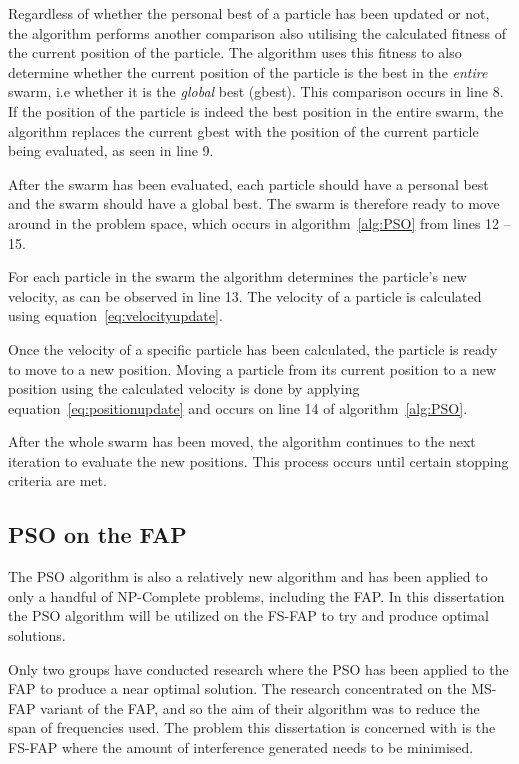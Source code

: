 Regardless of whether the personal best of a particle has been updated or not, the algorithm performs another comparison also utilising the calculated fitness of the current position of the particle. The algorithm uses this fitness to also determine whether the current position of the particle is the best in the \emph{entire} swarm, i.e whether it is  the \emph{global} best (gbest). This comparison occurs in line  8.
If the position of the particle is indeed the best position in the entire swarm, the algorithm replaces the current gbest with the position of the current particle being evaluated, as seen in line 9.

After the swarm has been evaluated, each particle should have a personal best and the swarm should have a global best. The swarm is therefore ready to move around in the problem space, which occurs in algorithm~\ref{alg:PSO} from lines 12 -- 15.

For each particle in the swarm the algorithm determines the particle's new velocity, as can be observed in line 13. The velocity of a particle is calculated using equation~\ref{eq:velocityupdate}. 

Once the velocity of a specific particle has been calculated, the particle is ready to move to a new position. Moving a particle from its current position to a new position using the calculated velocity is done by applying equation~\ref{eq:positionupdate} and occurs on line 14 of algorithm~\ref{alg:PSO}.

After the whole swarm has been moved, the algorithm continues to the next iteration to evaluate the new positions. This process occurs until certain stopping criteria are met.


\subsection{PSO on the \gls{FAP}}
\label{sec:psoonfap}
The \gls{PSO} algorithm is also a relatively new algorithm and has been applied to only a handful of NP-Complete problems, including the \gls{FAP}. In this dissertation the \gls{PSO} algorithm will be utilized on the \gls{FS-FAP} to try and produce optimal solutions. 

Only two groups have conducted research where the \gls{PSO} has been applied to the \gls{FAP} to produce a near optimal solution. The research concentrated on the \gls{MS-FAP} variant of the \gls{FAP}, and so the aim of their algorithm was to reduce the span of frequencies used. The problem this dissertation is concerned with is the \gls{FS-FAP} where the amount of interference generated needs to be minimised. 

